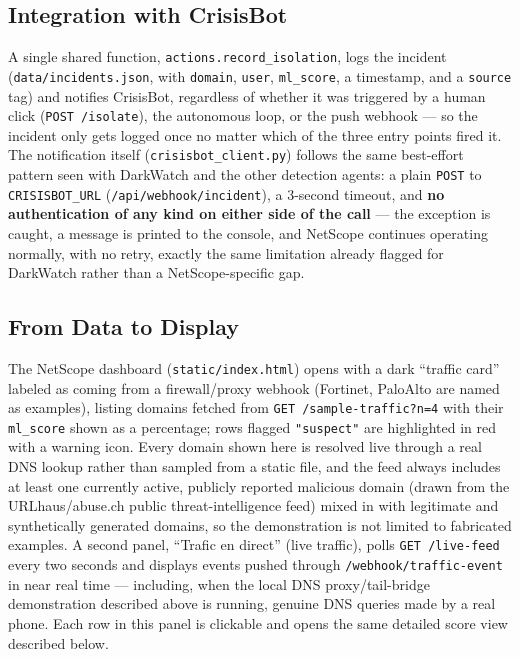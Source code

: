 \documentclass[12pt,a4paper]{report}
\begin{document}
\subsection*{Integration with CrisisBot}
A single shared function, \texttt{actions.record\_isolation}, logs the incident (\texttt{data/incidents.json}, with \texttt{domain}, \texttt{user}, \texttt{ml\_score}, a timestamp, and a \texttt{source} tag) and notifies CrisisBot, regardless of whether it was triggered by a human click (\texttt{POST /isolate}), the autonomous loop, or the push webhook --- so the incident only gets logged once no matter which of the three entry points fired it. The notification itself (\texttt{crisisbot\_client.py}) follows the same best-effort pattern seen with DarkWatch and the other detection agents: a plain \texttt{POST} to \texttt{CRISISBOT\_URL} (\texttt{/api/webhook/incident}), a 3-second timeout, and \textbf{no authentication of any kind on either side of the call} --- the exception is caught, a message is printed to the console, and NetScope continues operating normally, with no retry, exactly the same limitation already flagged for DarkWatch rather than a NetScope-specific gap.

\subsection*{From Data to Display}
The NetScope dashboard (\texttt{static/index.html}) opens with a dark ``traffic card'' labeled as coming from a firewall/proxy webhook (Fortinet, PaloAlto are named as examples), listing domains fetched from \texttt{GET /sample-traffic?n=4} with their \texttt{ml\_score} shown as a percentage; rows flagged \texttt{"suspect"} are highlighted in red with a warning icon. Every domain shown here is resolved live through a real DNS lookup rather than sampled from a static file, and the feed always includes at least one currently active, publicly reported malicious domain (drawn from the URLhaus/abuse.ch public threat-intelligence feed) mixed in with legitimate and synthetically generated domains, so the demonstration is not limited to fabricated examples. A second panel, ``Trafic en direct'' (live traffic), polls \texttt{GET /live-feed} every two seconds and displays events pushed through \texttt{/webhook/traffic-event} in near real time --- including, when the local DNS proxy/tail-bridge demonstration described above is running, genuine DNS queries made by a real phone. Each row in this panel is clickable and opens the same detailed score view described below.
\end{document}
